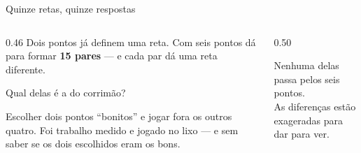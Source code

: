 \documentclass[aspectratio=169,11pt]{beamer}
\newcommand{\bnum}[1]{\textbf{\textcolor{mTeal}{#1}}}
\begin{document}
\begin{frame}{Quinze retas, quinze respostas}
  \begin{columns}[c]
    \begin{column}{0.46\textwidth}
      Dois pontos já definem uma reta. Com seis pontos dá para formar
      \bnum{15 pares} --- e cada par dá uma reta \alert{diferente}.
      \bigskip

      Qual delas é a do corrimão?
      \bigskip

      \begin{cuidado}[title={A tentação}]
        \small Escolher dois pontos ``bonitos'' e jogar fora os outros quatro.
        Foi trabalho medido e jogado no lixo --- e sem saber se os dois escolhidos
        eram os bons.
      \end{cuidado}
    \end{column}
    \begin{column}{0.50\textwidth}
      \centering
      \smallskip

      {\scriptsize\textcolor{mStoneMid}{Nenhuma delas passa pelos seis pontos.\\
      As diferenças estão exageradas para dar para ver.}}
    \end{column}
  \end{columns}
\end{frame}
\end{document}

